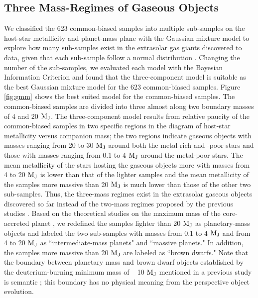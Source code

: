 \documentclass[twocolumn, dvipdfmx]{aastex62}
\begin{document}
\begin{CJK*}{UTF8}{min}
\subsection{Three Mass-Regimes of Gaseous Objects} \label{subsec:mass}

We classified the 623 common-biased samples into multiple sub-samples on the host-star metallicity and planet-mass plane with the Gaussian mixture model to explore how many sub-samples exist in the extrasolar gas giants discovered to data, given that each sub-sample follow a normal distribution \citep[e.g.,][]{2017A&A...603A..30S, 2018ApJ...853...37S}. Changing the number of the sub-samples, we evaluated each model with the Bayesian Information Criterion and found that the three-component model is suitable as the best Gaussian mixture model for the 623 common-biased samples. Figure \ref{fig:gmm} shows the best suited model for the common-biased samples. The common-biased samples are divided into three almost along two boundary masses of 4 and 20 $\rm M_J$. The three-component model results from relative paucity of the common-biased samples in two specific regions in the diagram of host-star metallicity versus companion mass; the two regions indicate gaseous objects with masses ranging from 20 to 30 $\rm M_J$ around both the metal-rich and -poor stars and those with masses ranging from 0.1 to 4 $\rm M_J$ around the metal-poor stars. The mean metallicity of the stars hosting the gaseous objects more with masses from 4 to 20 $\rm M_J$ is lower than that of the lighter samples and the mean metallicity of the samples more massive than 20 $\rm M_J$ is much lower than those of the other two sub-samples. Thus, the three-mass regimes exist in the extrasolar gaseous objects discovered so far instead of the two-mass regimes proposed by the previous studies \citep{2007A&A...464..779R, 2017A&A...603A..30S, 2018ApJ...853...37S}. Based on the theoretical studies on the maximum mass of the core-accreted planet \citep[e.g.,][]{2012A&A...541A..97M, 2016ApJ...823...48T}, we redefined the samples lighter than 20 $\rm M_J$ as planetary-mass objects and labeled the two sub-samples with masses from 0.1 to 4 $\rm M_J$ and from 4 to 20 $\rm M_J$ as ``intermediate-mass planets" and ``massive planets." In addition, the samples more massive than 20 $\rm M_J$ are labeled as ``brown dwarfs." Note that the boundary between planetary mass and brown dwarf objects established by the deuterium-burning minimum mass of ~ 10 $\rm M_J$ mentioned in a previous study is semantic \citep{2014prpl.conf..619C}; this boundary has no physical meaning from the perspective object evolution.


\end{CJK*}
\end{document}
